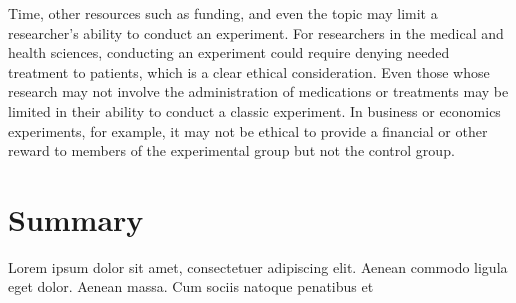 Time, other resources such as funding, and even the topic may limit a researcher's ability to conduct an experiment. For researchers in the medical and health sciences, conducting an experiment could require denying needed treatment to patients, which is a clear ethical consideration. Even those whose research may not involve the administration of medications or treatments may be limited in their ability to conduct a classic experiment. In business or economics experiments, for example, it may not be ethical to provide a financial or other reward to members of the experimental group but not the control group. 

\section{Summary}\label{ch09:summary}

Lorem ipsum dolor sit amet, consectetuer adipiscing elit. Aenean commodo ligula eget dolor. Aenean massa. Cum sociis natoque penatibus et

